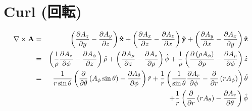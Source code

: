 %
%
%
%
%
\section{Curl (回転)}

\begin{eqnarray*}
\nabla \times \mathbf{A}  & = &   \left({\partial A_z \over \partial y} - {\partial A_y \over \partial z}\right) \mathbf{\hat x} + \left({\partial A_x \over \partial z} - {\partial A_z \over \partial x}\right) \mathbf{\hat y} + \left({\partial A_y \over \partial x} - {\partial A_x \over \partial y}\right) \mathbf{\hat z} \\
                  & = & \left({1 \over \rho}{\partial A_z \over \partial \phi} - {\partial A_\phi \over \partial z}\right) {\hat \rho} + \left({\partial A_\rho \over \partial z} - {\partial A_z \over \partial \rho}\right) {\hat \phi} + {1 \over \rho}\left({\partial \left( \rho A_\phi \right) \over \partial \rho} - {\partial A_\rho \over \partial \phi}\right) {\hat z} \\
                  & = & {1 \over r\sin\theta}\left({\partial \over \partial \theta} \left( A_\phi\sin\theta \right) - {\partial A_\theta \over \partial \phi}\right) {\hat r} + {1 \over r}\left({1 \over \sin\theta}{\partial A_r \over \partial \phi} - {\partial \over \partial r} \left( r A_\phi \right) \right) {\hat \theta} \\
                  & &   + {1 \over r}\left({\partial \over \partial r} \left( r A_\theta \right) - {\partial A_r \over \partial \theta}\right) {\hat \phi}
\end{eqnarray*}
